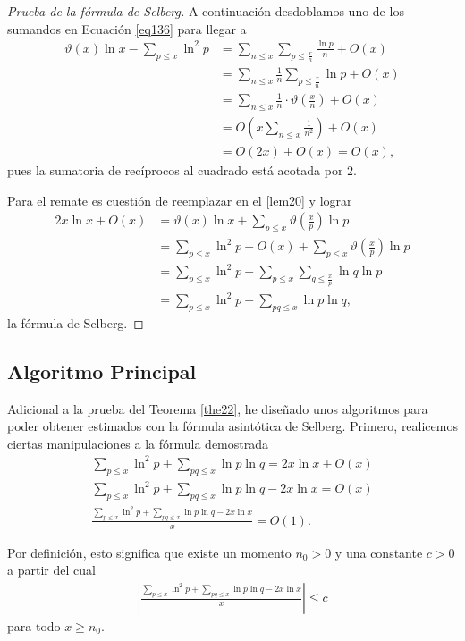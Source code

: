\documentclass[10pt]{article}
\theoremstyle{definition}
\theoremstyle{remark}
\begin{document}
\begin{proof}[Prueba de la f\'ormula de Selberg]
A continuaci\'on desdoblamos uno de los sumandos en Ecuaci\'on \ref{eq136} para llegar a 
\begin{align}
\vartheta(x)\ln x - \sum_{p \leq x} \ln^2 p &= \sum_{n \leq x} \sum_{p \leq \frac{x}{n}} \frac{\ln p}{n} + O(x) \\
&= \sum_{n \leq x} \frac{1}{n}\sum_{p \leq \frac{x}{n}} \ln p + O(x) \\
&= \sum_{n \leq x} \frac{1}{n}\cdot \vartheta\left(\frac{x}{n}\right) + O(x) \\
&= O\left(x \sum_{n \leq x} \frac{1}{n^2}\right) + O(x) \\
&= O(2x)+O(x)=O(x), 
\end{align}
pues la sumatoria de rec\'iprocos al cuadrado est\'a acotada por $2$. 

Para el remate es cuesti\'on de reemplazar en el \cref{lem20} y lograr  
\begin{align}
2x\ln x + O(x) &= \vartheta(x)\ln x + \sum_{p \leq x} \vartheta\left(\frac{x}{p}\right)\ln p  \\
&= \sum_{p \leq x} \ln^2 p + O(x) + \sum_{p \leq x} \vartheta\left(\frac{x}{p}\right)\ln p  \\
&= \sum_{p \leq x} \ln^2 p + \sum_{p \leq x} \sum_{q \leq \frac{x}{p}} \ln q \ln p  \\
&= \sum_{p \leq x} \ln^2 p + \sum_{pq \leq x} \ln p \ln q, 
\end{align}
la f\'ormula de Selberg.
\end{proof}

\subsection{Algoritmo Principal}
Adicional a la prueba del Teorema \ref{the22}, he dise\~nado unos algoritmos para poder obtener estimados
con la f\'ormula asint\'otica de Selberg. Primero, realicemos ciertas manipulaciones a la f\'ormula demostrada
\begin{gather}
\sum_{p \leq x} \ln^2 p + \sum_{pq \leq x} \ln p \ln q = 2x\ln x + O(x) \\
\sum_{p \leq x} \ln^2 p + \sum_{pq \leq x} \ln p \ln q - 2x\ln x = O(x) \\
\frac{\sum_{p \leq x} \ln^2 p + \sum_{pq \leq x} \ln p \ln q - 2x\ln x}{x} = O(1).
\end{gather}

Por definici\'on, esto significa que existe un momento $n_0 > 0$ y una constante $c > 0$ a partir del cual
\begin{align}
\left|\frac{\sum_{p \leq x} \ln^2 p + \sum_{pq \leq x} \ln p \ln q - 2x\ln x}{x}\right| \leq c
\end{align}
para todo $x \geq n_0$.
\end{document}
